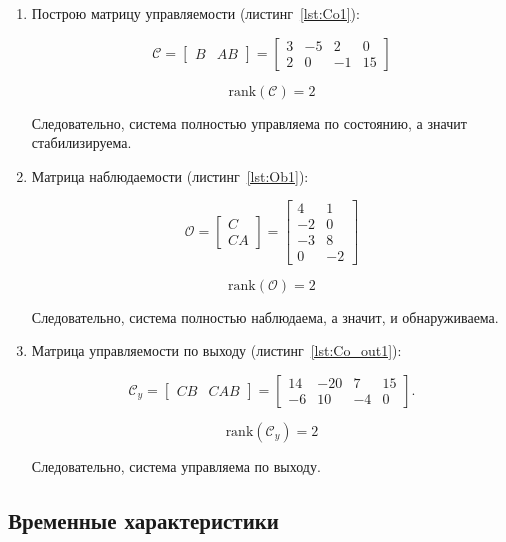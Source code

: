 \documentclass[a4paper,12pt]{article}
\begin{document}
	
	\begin{enumerate}
		\item Построю матрицу управляемости (листинг~\ref{lst:Co1}):
		
		\[
		\mathcal{C} = \begin{bmatrix} B & AB \end{bmatrix} = 
		\begin{bmatrix}
			3 & -5 & 2 & 0 \\
			2 & 0 & -1 & 15
		\end{bmatrix}
		\]
		
		\[
		\text{rank}(\mathcal{C}) = 2
		\]
		
		Следовательно, система полностью управляема по состоянию, а значит  стабилизируема.
		
		
		\item Матрица наблюдаемости (листинг~\ref{lst:Ob1}):
		
		\[
		\mathcal{O} = \begin{bmatrix} C \\ CA \end{bmatrix} = 
		\begin{bmatrix}
			4 & 1 \\
			-2 & 0 \\
			-3 & 8 \\
			0 & -2
		\end{bmatrix}
		\]
		
		\[
		\text{rank}(\mathcal{O}) = 2
		\]
		
		Следовательно, система полностью наблюдаема, а значит, и обнаруживаема.
		
		\item Матрица управляемости по выходу (листинг~\ref{lst:Co_out1}):
		
		\[
		\mathcal{C}_y = \begin{bmatrix} CB & CAB \end{bmatrix} = 
		\begin{bmatrix}
			14 & -20 & 7 & 15 \\
			-6 & 10 & -4 & 0
		\end{bmatrix}.
		\]
		
		\[
		\text{rank}(\mathcal{C}_y) = 2
		\]
		
		Следовательно, система управляема по выходу.
		
	\end{enumerate}
	
	\subsection{Временные характеристики}
	
\end{document}

